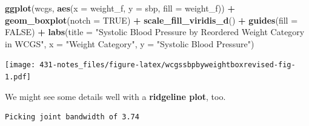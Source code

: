 \documentclass[
]{book}
\newenvironment{Shaded}{\begin{snugshade}}{\end{snugshade}}
\newcommand{\DataTypeTok}[1]{\textcolor[rgb]{0.13,0.29,0.53}{#1}}
\newcommand{\DecValTok}[1]{\textcolor[rgb]{0.00,0.00,0.81}{#1}}
\newcommand{\KeywordTok}[1]{\textcolor[rgb]{0.13,0.29,0.53}{\textbf{#1}}}
\newcommand{\NormalTok}[1]{#1}
\newcommand{\OperatorTok}[1]{\textcolor[rgb]{0.81,0.36,0.00}{\textbf{#1}}}
\newcommand{\OtherTok}[1]{\textcolor[rgb]{0.56,0.35,0.01}{#1}}
\newcommand{\StringTok}[1]{\textcolor[rgb]{0.31,0.60,0.02}{#1}}
\begin{document}
\begin{Shaded}
\begin{Highlighting}[]
\KeywordTok{ggplot}\NormalTok{(wcgs, }\KeywordTok{aes}\NormalTok{(}\DataTypeTok{x =}\NormalTok{ weight_f, }\DataTypeTok{y =}\NormalTok{ sbp, }\DataTypeTok{fill =}\NormalTok{ weight_f)) }\OperatorTok{+}
\StringTok{    }\KeywordTok{geom_boxplot}\NormalTok{(}\DataTypeTok{notch =} \OtherTok{TRUE}\NormalTok{) }\OperatorTok{+}
\StringTok{    }\KeywordTok{scale_fill_viridis_d}\NormalTok{() }\OperatorTok{+}
\StringTok{    }\KeywordTok{guides}\NormalTok{(}\DataTypeTok{fill =} \OtherTok{FALSE}\NormalTok{) }\OperatorTok{+}
\StringTok{    }\KeywordTok{labs}\NormalTok{(}\DataTypeTok{title =} \StringTok{"Systolic Blood Pressure by Reordered Weight Category in WCGS"}\NormalTok{, }
         \DataTypeTok{x =} \StringTok{"Weight Category"}\NormalTok{, }\DataTypeTok{y =} \StringTok{"Systolic Blood Pressure"}\NormalTok{)}
\end{Highlighting}
\end{Shaded}

\texttt{[image: 431-notes\_files/figure-latex/wcgssbpbyweightboxrevised-fig-1.pdf]}

We might see some details well with a \textbf{ridgeline plot}, too.

\begin{Shaded}
\end{Shaded}

\begin{verbatim}
Picking joint bandwidth of 3.74
\end{verbatim}
\end{document}
